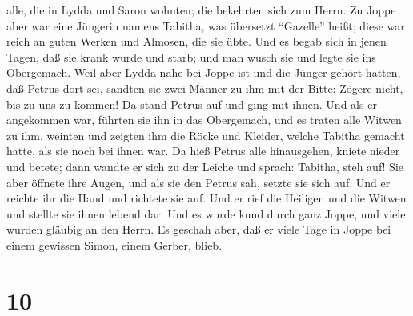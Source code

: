 alle, die in Lydda und Saron wohnten; die bekehrten sich zum Herrn.
 Zu Joppe aber war eine Jüngerin namens Tabitha, was
übersetzt ``Gazelle'' heißt; diese war reich an guten Werken und
Almosen, die sie übte.  Und es begab sich in jenen Tagen,
daß sie krank wurde und starb; und man wusch sie und legte sie ins
Obergemach.  Weil aber Lydda nahe bei Joppe ist und die
Jünger gehört hatten, daß Petrus dort sei, sandten sie zwei Männer zu
ihm mit der Bitte: Zögere nicht, bis zu uns zu kommen! 
Da stand Petrus auf und ging mit ihnen. Und als er angekommen war,
führten sie ihn in das Obergemach, und es traten alle Witwen zu ihm,
weinten und zeigten ihm die Röcke und Kleider, welche Tabitha gemacht
hatte, als sie noch bei ihnen war.  Da hieß Petrus alle
hinausgehen, kniete nieder und betete; dann wandte er sich zu der Leiche
und sprach: Tabitha, steh auf! Sie aber öffnete ihre Augen, und als sie
den Petrus sah, setzte sie sich auf.  Und er reichte ihr
die Hand und richtete sie auf. Und er rief die Heiligen und die Witwen
und stellte sie ihnen lebend dar.  Und es wurde kund
durch ganz Joppe, und viele wurden gläubig an den Herrn. 
Es geschah aber, daß er viele Tage in Joppe bei einem gewissen Simon,
einem Gerber, blieb.

\hypertarget{section-9}{%
\section{10}\label{section-9}}

